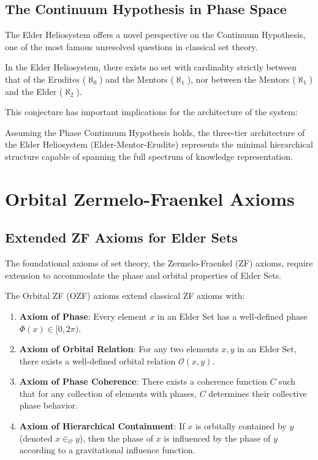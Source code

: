 \subsection{The Continuum Hypothesis in Phase Space}

The Elder Heliosystem offers a novel perspective on the Continuum Hypothesis, one of the most famous unresolved questions in classical set theory.

\begin{conjecture}
In the Elder Heliosystem, there exists no set with cardinality strictly between that of the Erudites ($\aleph_0$) and the Mentors ($\aleph_1$), nor between the Mentors ($\aleph_1$) and the Elder ($\aleph_2$).
\end{conjecture}

This conjecture has important implications for the architecture of the system:

\begin{proposition}
Assuming the Phase Continuum Hypothesis holds, the three-tier architecture of the Elder Heliosystem (Elder-Mentor-Erudite) represents the minimal hierarchical structure capable of spanning the full spectrum of knowledge representation.
\end{proposition}

\section{Orbital Zermelo-Fraenkel Axioms}

\subsection{Extended ZF Axioms for Elder Sets}

The foundational axioms of set theory, the Zermelo-Fraenkel (ZF) axioms, require extension to accommodate the phase and orbital properties of Elder Sets.

\begin{definition}
The Orbital ZF (OZF) axioms extend classical ZF axioms with:
\begin{enumerate}
    \item \textbf{Axiom of Phase}: Every element $x$ in an Elder Set has a well-defined phase $\Phi(x) \in [0, 2\pi)$.
    \item \textbf{Axiom of Orbital Relation}: For any two elements $x, y$ in an Elder Set, there exists a well-defined orbital relation $\mathcal{O}(x, y)$.
    \item \textbf{Axiom of Phase Coherence}: There exists a coherence function $C$ such that for any collection of elements with phases, $C$ determines their collective phase behavior.
    \item \textbf{Axiom of Hierarchical Containment}: If $x$ is orbitally contained by $y$ (denoted $x \in_{\mathcal{O}} y$), then the phase of $x$ is influenced by the phase of $y$ according to a gravitational influence function.
\end{enumerate}
\end{definition}

